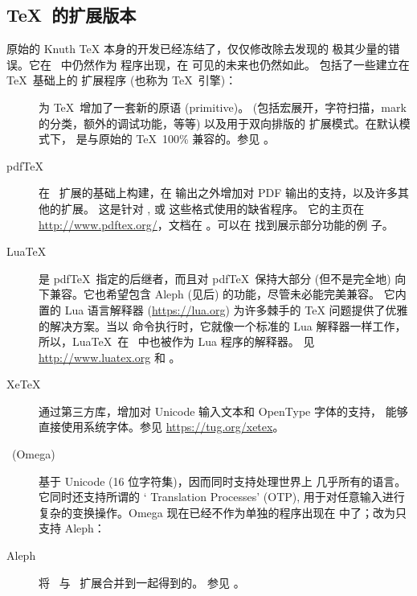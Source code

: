 \documentclass{article}
\begin{document}
\subsection{\protect\TeX\ 的扩展版本}
\label{sec:tex-extensions}

原始的 Knuth \TeX{} 本身的开发已经冻结了，仅仅修改除去发现的
极其少量的错误。它在 \TL\ 中仍然作为  程序出现，在
可见的未来也仍然如此。\TL{} 包括了一些建立在 \TeX\ 基础上的
扩展程序 (也称为 \TeX\ 引擎)：

\begin{description}

\item [\eTeX] 为 \TeX\ 增加了一套新的原语 (primitive)。
\label{text:etex} (包括宏展开，字符扫描，mark 的分类，额外的调试功能，等等)
以及用于双向排版的 \TeXXeT{} 扩展模式。在默认模式下，\eTeX{} 是与原始的 \TeX\
100\% 兼容的。参见 。

\item [pdf\TeX] 在 \eTeX\ 扩展的基础上构建，在 \dvi{} 输出之外增加对
PDF 输出的支持，以及许多其他的扩展。
这是针对 ,  或  这些格式使用的缺省程序。
它的主页在 \url{http://www.pdftex.org/}，文档在
。可以在
 找到展示部分功能的例
子。

\item  [Lua\TeX] 是 pdf\TeX\ 指定的后继者，而且对 pdf\TeX\ 保持大部分
(但不是完全地) 向下兼容。它也希望包含 Aleph (见后) 的功能，尽管未必能完美兼容。
它内置的 Lua 语言解释器 (\url{https://lua.org}) 为许多棘手的 \TeX{}
问题提供了优雅的解决方案。当以  命令执行时，它就像一个标准的
Lua 解释器一样工作，所以，Lua\TeX\ 在 \TL\ 中也被作为 Lua 程序的解释器。
见 \url{http://www.luatex.org} 和 。

\item [Xe\TeX] 通过第三方库，增加对 Unicode 输入文本和 OpenType 字体的支持，
能够直接使用系统字体。参见 \url{https://tug.org/xetex}。

\item [\OMEGA\ (Omega)] 基于 Unicode (16 位字符集)，因而同时支持处理世界上
几乎所有的语言。它同时还支持所谓的 `\OMEGA{} Translation Processes' (OTP),
用于对任意输入进行复杂的变换操作。Omega 现在已经不作为单独的程序出现在 \TL{}
中了；改为只支持 Aleph：

\item [Aleph] 将 \OMEGA\ 与 \eTeX\ 扩展合并到一起得到的。
参见 。

\end{description}
\end{document}
